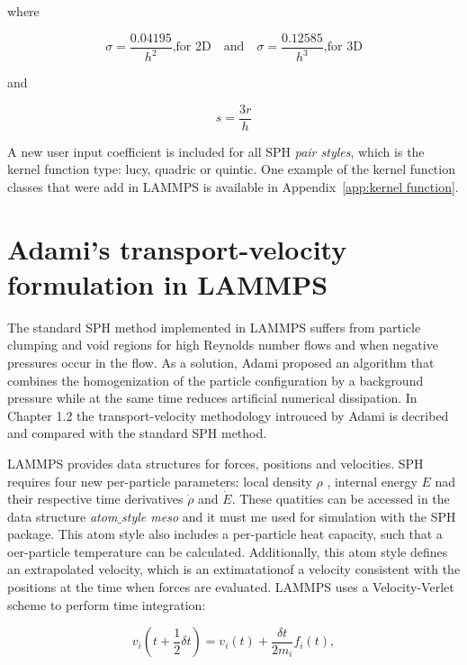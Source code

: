where

\begin{equation}
 \sigma = \frac{0.04195}{h^2} \text{,for 2D} \quad \text{and} \quad \sigma = \frac{0.12585}{h^3} \text{,for 3D}
\end{equation}

and 

\begin{equation}
 s = \frac{3r}{h}
\end{equation}

A new user input coefficient is included for all SPH \textit{pair styles}, which is the kernel function type: lucy, quadric or quintic. One example of the kernel function classes
that were add in LAMMPS is available in Appendix~\ref{app:kernel function}.

\section{Adami's transport-velocity formulation in LAMMPS}
\label{sec:section 6}


The standard SPH method implemented in LAMMPS suffers from particle clumping and void regions for high Reynolds number flows and when negative pressures occur in the flow.
As a solution, Adami \cite{adami_transport-velocity_2013} proposed an algorithm that combines the homogenization of the particle configuration by a background pressure while at the same
time reduces artificial numerical dissipation. In Chapter 1.2 the transport-velocity methodology introuced by Adami is decribed and compared with the standard SPH method.\par

LAMMPS provides data structures for forces, positions and velocities. SPH requires four new per-particle parameters: local density $\rho$ , internal energy $E$ nad their respective
time derivatives $\dot{\rho}$ and $\dot{E}$. These quatities can be accessed in the data structure \textit{atom$\_$style meso} and it must me used for simulation with the SPH package.
This atom style also includes a per-particle heat capacity, such that a oer-particle temperature can be calculated. Additionally, this atom style defines an extrapolated velocity,
which is an extimatationof a velocity consistent with the positions at the time when forces are evaluated. LAMMPS uses a Velocity-Verlet scheme to perform time integration:

\begin{equation}
v_{i}(t+\frac{1}{2}\delta t) = v_{i}(t) + \frac{\delta t}{2m_{i}} f_{i}(t),
\end{equation}

